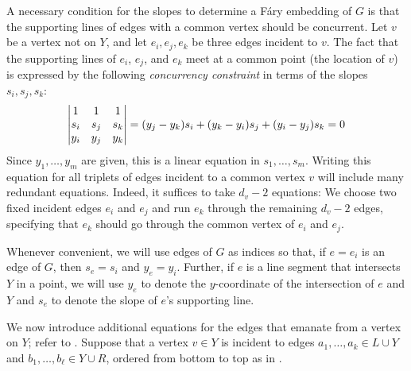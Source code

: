A necessary condition for the slopes to determine a F\'ary embedding of $G$ is that the supporting lines of edges 
with a common vertex should be concurrent. Let $v$ be a vertex 
not on $Y$, and let $e_i, e_j, e_k$ be three edges incident to $v$.
The fact that the supporting lines of $e_i$, $e_j$, and $e_k$
meet at a common point (the location of $v$) is expressed by the following
\emph{concurrency constraint} in terms of the slopes $s_i,s_j,s_k$:
\begin{equation}\eqlabel{slope0} 
\left|
\begin{matrix}
1&1&1\\
s_i&s_j&s_k\\
y_i&y_j&y_k
\end{matrix}
\right|=
({y_j-y_k}) s_i + ({y_k-y_i}) s_j 
+ ({y_i-y_j})s_k  = 0
\end{equation}
Since $y_1,\ldots,y_m$ are given, this is a linear equation
in $s_1,\ldots,s_m$.
Writing this equation for all triplets of edges incident to a common
vertex $v$ will include many redundant equations. Indeed, it suffices to take $d_v-2$ equations: We choose two fixed
incident edges $e_i$ and $e_j$ and run $e_k$ through the remaining
$d_v-2$ edges, specifying that $e_k$ should go through the common vertex
of $e_i$ and $e_j$.

Whenever convenient, we will use edges of $G$
as indices so that, if $e=e_i$ is an edge of $G$, then $s_e=s_i$
and $y_e=y_i$.  Further, if $e$ is a line segment that
intersects $Y$ in a point, we will use $y_e$ to denote the $y$-coordinate
of the intersection of $e$ and $Y$ and $s_e$ to denote the slope of
$e$'s supporting line.


We now introduce additional equations for the edges that emanate from a
vertex on $Y$; refer to .
Suppose that a vertex $v\in Y$ is incident to edges $a_1,\ldots,a_k\in L\cup Y$ 
and $b_1,\ldots,b_\ell\in Y\cup R$, ordered from bottom to top as in .


